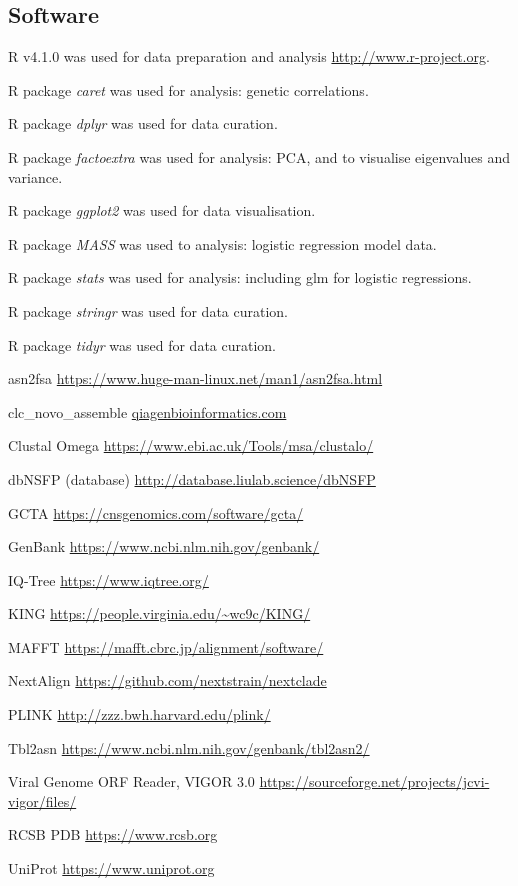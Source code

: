 \documentclass[9pt,lineno]{elife}  %
\begin{document}
\subsection{Software}
\begin{description}[noitemsep]

\item R v4.1.0 was used for data preparation and analysis \url{http://www.r-project.org}.
\item R package \textit{caret} was used for analysis: genetic correlations.
\item R package \textit{dplyr} was used for data curation.
\item R package \textit{factoextra} was used for analysis: PCA, and to visualise eigenvalues and variance.
\item R package \textit{ggplot2} was used for data visualisation.
\item R package \textit{MASS} was used to analysis: logistic regression model data.
\item R package \textit{stats} was used for analysis: including glm for logistic regressions. 
\item R package \textit{stringr} was used for data curation.
\item R package \textit{tidyr} was used for data curation.
\item asn2fsa \url{https://www.huge-man-linux.net/man1/asn2fsa.html}
\item clc\_novo\_assemble \href{https://resources.qiagenbioinformatics.com/manuals
/clcgenomicsworkbench/852/index.php?manual=De_novo_assembly.html}{qiagenbioinformatics.com} \
\item Clustal Omega \url{https://www.ebi.ac.uk/Tools/msa/clustalo/}
\item dbNSFP (database) \url{http://database.liulab.science/dbNSFP} \citep{liu2016dbnsfp}
\item GCTA \url{https://cnsgenomics.com/software/gcta/} \citep{yang2011gcta}
\item GenBank \url{https://www.ncbi.nlm.nih.gov/genbank/}
\item IQ-Tree \url{https://www.iqtree.org/} \citep{nguyen2015iq}
\item KING \url{https://people.virginia.edu/~wc9c/KING/} \citep{manichaikul_robust_2010}
\item MAFFT \url{https://mafft.cbrc.jp/alignment/software/} \citep{katoh2013mafft}
\item NextAlign \url{https://github.com/nextstrain/nextclade}
\item PLINK \url{http://zzz.bwh.harvard.edu/plink/} \citep{purcell2007plink}
\item Tbl2asn \url{https://www.ncbi.nlm.nih.gov/genbank/tbl2asn2/}
\item Viral Genome ORF Reader, VIGOR 3.0 \url{https://sourceforge.net/projects/jcvi-vigor/files/}
\item RCSB PDB \url{https://www.rcsb.org}
\item UniProt \url{https://www.uniprot.org}

\end{description}
\end{document}
